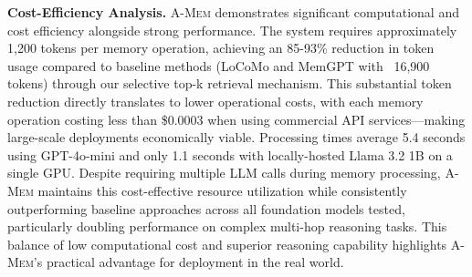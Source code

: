 \documentclass{article}
\newcommand{\ours}{\textsc{A-Mem}\xspace}
\begin{document}
\textbf{Cost-Efficiency Analysis.}
\ours demonstrates significant computational and cost efficiency alongside strong performance. The system requires approximately 1,200 tokens per memory operation, achieving an 85-93\% reduction in token usage compared to baseline methods (LoCoMo and MemGPT with ~16,900 tokens) through our selective top-k retrieval mechanism. This substantial token reduction directly translates to lower operational costs, with each memory operation costing less than \$0.0003 when using commercial API services—making large-scale deployments economically viable. Processing times average 5.4 seconds using GPT-4o-mini and only 1.1 seconds with locally-hosted Llama 3.2 1B on a single GPU. Despite requiring multiple LLM calls during memory processing, \ours maintains this cost-effective resource utilization while consistently outperforming baseline approaches across all foundation models tested, particularly doubling performance on complex multi-hop reasoning tasks. This balance of low computational cost and superior reasoning capability highlights \ours's practical advantage for deployment in the real world.
\end{document}
